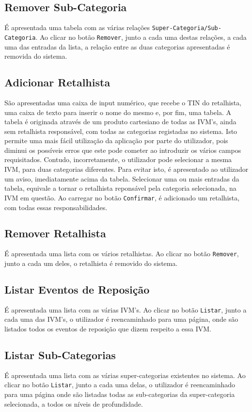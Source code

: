 \documentclass{article}
\begin{document}
\subsection{Remover Sub-Categoria}
É apresentada uma tabela com as várias relações \texttt{Super-Categoria/Sub-Categoria}.
Ao clicar no botão \texttt{Remover}, junto a cada uma destas relações, a cada uma das entradas da lista, a relação entre as duas categorias apresentadas é removida do sistema.

\subsection{Adicionar Retalhista}
São apresentadas uma caixa de input numérico, que recebe o TIN do retalhista,
uma caixa de texto para inserir o nome do mesmo e, por fim, uma tabela.
A tabela é originada através de um produto cartesiano de todas as IVM's,
ainda sem retalhista responsável, com todas as categorias registadas no sistema.
Isto permite uma mais fácil utilização da aplicação por parte do utilizador, pois
diminui os possíveis erros que este pode cometer ao introduzir os vários campos
requisitados. Contudo, incorretamente, o utilizador pode selecionar a mesma IVM,
para duas categorias diferentes. Para evitar isto, é apresentado ao utilizador um
aviso, imediatamente acima da tabela.
Selecionar uma ou mais entradas da tabela, equivale a tornar o retalhista
reponsável pela categoria selecionada, na IVM em questão.
Ao carregar no botão \texttt{Confirmar}, é adicionado um retalhista, com todas
essas responsabilidades.

\subsection{Remover Retalhista}
É apresentada uma lista com os vários retalhistas.
Ao clicar no botão \texttt{Remover}, junto a cada um deles, o retalhista é
removido do sistema.

\subsection{Listar Eventos de Reposição}
É apresentada uma lista com as várias IVM's. Ao clicar no botão \texttt{Listar},
junto a cada uma das IVM's, o utilizador é reencaminhado para uma página, onde
são listados todos os eventos de reposição que dizem respeito a essa IVM.

\subsection{Listar Sub-Categorias}
É apresentada uma lista com as várias super-categorias existentes no sistema.
Ao clicar no botão \texttt{Listar}, junto a cada uma delas, o utilizador é
reencaminhado para uma página onde são listadas todas as sub-categorias da
super-categoria selecionada, a todos os níveis de profundidade.
\end{document}
